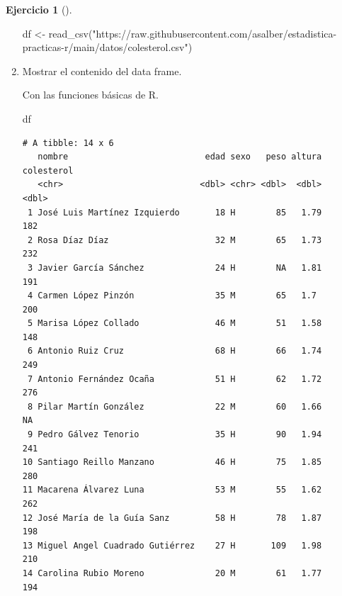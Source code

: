 \documentclass[
  a4paper,
]{scrreport}
\newenvironment{Shaded}{\begin{snugshade}}{\end{snugshade}}
\newcommand{\FunctionTok}[1]{\textcolor[rgb]{0.28,0.35,0.67}{#1}}
\newcommand{\NormalTok}[1]{\textcolor[rgb]{0.00,0.23,0.31}{#1}}
\newcommand{\OtherTok}[1]{\textcolor[rgb]{0.00,0.23,0.31}{#1}}
\newcommand{\StringTok}[1]{\textcolor[rgb]{0.13,0.47,0.30}{#1}}
\theoremstyle{definition}
\newtheorem{exercise}{Ejercicio}[chapter]
\theoremstyle{remark}
\begin{document}
\begin{exercise}[]
\begin{enumerate}
\begin{tcolorbox}
\begin{Shaded}
\begin{Highlighting}[]
\NormalTok{df }\OtherTok{\textless{}{-}} \FunctionTok{read\_csv}\NormalTok{(}\StringTok{"https://raw.githubusercontent.com/asalber/estadistica{-}practicas{-}r/main/datos/colesterol.csv"}\NormalTok{)}
\end{Highlighting}
\end{Shaded}

  \end{tcolorbox}
\item
  Mostrar el contenido del data frame.

  \begin{tcolorbox}[enhanced jigsaw, coltitle=black, left=2mm, colback=white, leftrule=.75mm, toptitle=1mm, breakable, bottomrule=.15mm, titlerule=0mm, bottomtitle=1mm, title=\textcolor{quarto-callout-tip-color}{\faLightbulb}\hspace{0.5em}{Solución 1}, arc=.35mm, toprule=.15mm, rightrule=.15mm, colframe=quarto-callout-tip-color-frame, opacityback=0, colbacktitle=quarto-callout-tip-color!10!white, opacitybacktitle=0.6]

  Con las funciones básicas de R.

\begin{Shaded}
\begin{Highlighting}[]
\NormalTok{df }
\end{Highlighting}
\end{Shaded}

\begin{verbatim}
# A tibble: 14 x 6
   nombre                           edad sexo   peso altura colesterol
   <chr>                           <dbl> <chr> <dbl>  <dbl>      <dbl>
 1 José Luis Martínez Izquierdo       18 H        85   1.79        182
 2 Rosa Díaz Díaz                     32 M        65   1.73        232
 3 Javier García Sánchez              24 H        NA   1.81        191
 4 Carmen López Pinzón                35 M        65   1.7         200
 5 Marisa López Collado               46 M        51   1.58        148
 6 Antonio Ruiz Cruz                  68 H        66   1.74        249
 7 Antonio Fernández Ocaña            51 H        62   1.72        276
 8 Pilar Martín González              22 M        60   1.66         NA
 9 Pedro Gálvez Tenorio               35 H        90   1.94        241
10 Santiago Reillo Manzano            46 H        75   1.85        280
11 Macarena Álvarez Luna              53 M        55   1.62        262
12 José María de la Guía Sanz         58 H        78   1.87        198
13 Miguel Angel Cuadrado Gutiérrez    27 H       109   1.98        210
14 Carolina Rubio Moreno              20 M        61   1.77        194
\end{verbatim}


\end{tcolorbox}
\end{enumerate}
\end{exercise}
\end{document}
